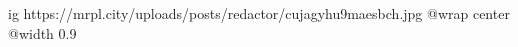  
 
 
 
 

\ifcmt
  ig https://mrpl.city/uploads/posts/redactor/cujagyhu9maesbch.jpg
  @wrap center
  @width 0.9
\fi
